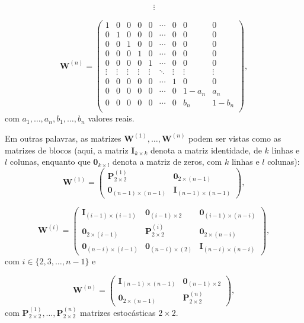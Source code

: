 \documentclass[twoside,openright,titlepage,numbers=noenddot,headinclude,  lineheaders footinclude=true,cleardoublepage=empty,
                                BCOR=5mm,paper=a4,fontsize=12pt ]{scrbook}
\theoremstyle{definition}
\begin{document}
\begin{align*}
 \vdots %
\end{align*}

\[
\mathbf{W}^{(n)}=
\begin{pmatrix}
1 & 0   & 0 & 0 & 0 & \cdots & 0 & 0 & 0\\
0   & 1 & 0 & 0 & 0 & \cdots & 0 & 0 & 0\\
0   & 0   & 1 & 0 & 0 & \cdots & 0 & 0 & 0\\
0   & 0   & 0 & 1 & 0 & \cdots & 0 & 0 & 0\\
0   & 0   & 0 & 0 & 1 & \cdots & 0 & 0 & 0\\
\vdots & \vdots & \vdots & \vdots & \vdots & \ddots & \vdots
& \vdots & \vdots\\
0   & 0   & 0 & 0 & 0 & \cdots & 1 & 0 & 0\\
0   & 0   & 0 & 0 & 0 & \cdots & 0 & 1-a_n & a_n\\
0   & 0   & 0 & 0 & 0 & \cdots & 0 & b_n & 1-b_n\\
\end{pmatrix}
,
\]
com $a_1, \ldots, a_n, b_1, \ldots, b_n$ valores reais.

Em outras palavras,
as matrizes $\mathbf{W}^{(1)}, \ldots, \mathbf{W}^{(n)}$ podem ser 
vistas como as matrizes de blocos (aqui, a matriz
$\mathbf{I}_{k \times k}$ denota a matriz identidade, de $k$ linhas
e $l$ colunas, enquanto que $\mathbf{0}_{k \times l}$ denota a 
matriz de zeros, com $k$ linhas e $l$ colunas):
\[
\mathbf{W}^{(1)} = 
\begin{pmatrix}
\mathbf{P}^{(1)}_{2 \times 2} & \mathbf{0}_{2 \times (n-1)}\\
\mathbf{0}_{(n-1) \times (n-1)} & \mathbf{I}_{(n-1)\times (n-1)}
\end{pmatrix}
,
\]

\[
\mathbf{W}^{(i)} = 
\begin{pmatrix}
\mathbf{I}_{(i-1)\times (i-1)}& \mathbf{0}_{(i-1) \times 2} &
\mathbf{0}_{(i-1) \times (n-i)} \\
\mathbf{0}_{2 \times (i-1)} & \mathbf{P}^{(i)}_{2 \times 2} &
 \mathbf{0}_{2 \times (n-i)}\\
\mathbf{0}_{(n-i) \times (i-1)} & \mathbf{0}_{(n-i) \times (2)}
 & \mathbf{I}_{(n-i)\times (n-i)}
\end{pmatrix}
,
\]
com $ i \in \{2, 3, \ldots, n-1\}$ e

\[
\mathbf{W}^{(n)} = 
\begin{pmatrix}
\mathbf{I}_{(n-1)\times (n-1)}& \mathbf{0}_{(n-1) \times 2} \\
\mathbf{0}_{2 \times (n-1)}   & \mathbf{P}^{(n)}_{2 \times 2}   
\end{pmatrix}
,
\]
com $\mathbf{P}^{(1)}_{2 \times 2}, \ldots, 
\mathbf{P}^{(n)}_{2 \times 2}$ matrizes estocásticas $ 2 \times 2$.
\end{document}
